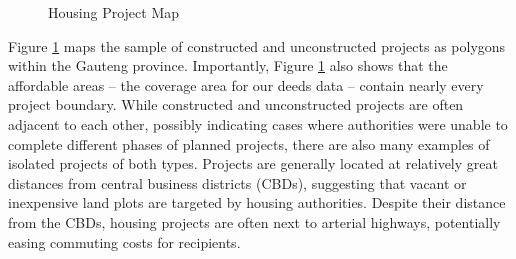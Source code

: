 \documentclass[12pt]{article}
\begin{document}


\begin{figure}[t!]
\centering
\caption{Housing Project Map}\label{figure:map}
\end{figure}

Figure \ref{figure:map} maps the sample of constructed and unconstructed projects as polygons within the Gauteng province. Importantly, Figure \ref{figure:map} also shows that the affordable areas -- the coverage area for our deeds data -- contain nearly every project boundary. While constructed and unconstructed projects are often adjacent to each other, possibly indicating cases where authorities were unable to complete different phases of planned projects, there are also many examples of isolated projects of both types.  Projects are generally located at relatively great distances from central business districts (CBDs), suggesting that vacant or inexpensive land plots are targeted by housing authorities.  Despite their distance from the CBDs, housing projects are often next to arterial highways, potentially easing commuting costs for recipients.

\end{document}
